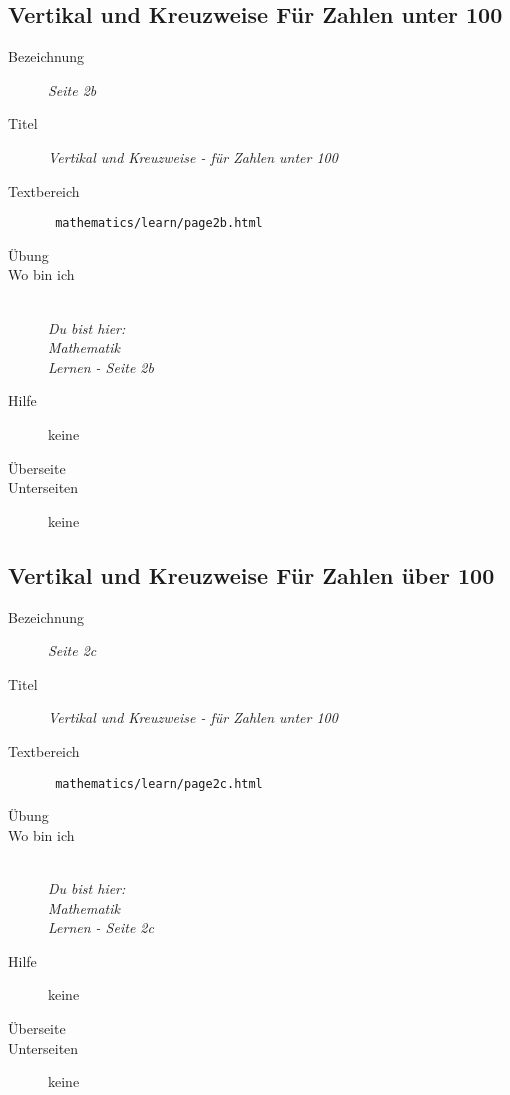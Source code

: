 \subsection{ Vertikal und Kreuzweise Für Zahlen unter 100 }
\label{cha:math-learn-page2b}
\begin{description}
  \item[Bezeichnung] \emph{ Seite 2b }
  \item[Titel] \emph{ Vertikal und Kreuzweise - für Zahlen unter 100 }
  \item[Textbereich] \texttt{ mathematics/learn/page2b.html }
  \item[Übung] 
  \item[Wo bin ich] \emph{\\Du bist hier:\\Mathematik\\Lernen - Seite 2b }
  \item[Hilfe] keine
  \item[Überseite] 
  \item[Unterseiten] keine
\end{description}


\subsection{ Vertikal und Kreuzweise Für Zahlen über 100 }
\label{cha:math-learn-page2c}
\begin{description}
  \item[Bezeichnung] \emph{ Seite 2c }
  \item[Titel] \emph{ Vertikal und Kreuzweise - für Zahlen unter 100 }
  \item[Textbereich] \texttt{ mathematics/learn/page2c.html }
  \item[Übung] 
  \item[Wo bin ich] \emph{\\Du bist hier:\\Mathematik\\Lernen - Seite 2c }
  \item[Hilfe] keine
  \item[Überseite] 
  \item[Unterseiten] keine
\end{description}


